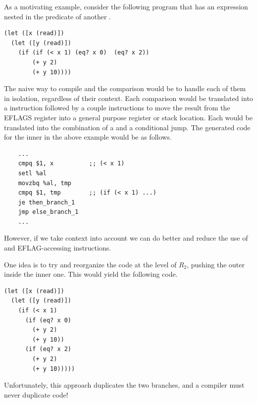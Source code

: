 \documentclass[11pt]{book}
\begin{document}
As a motivating example, consider the following program that has an
 expression nested in the predicate of another .
\begin{center}
\begin{minipage}{0.96\textwidth}
\begin{lstlisting}
(let ([x (read)])
  (let ([y (read)])
    (if (if (< x 1) (eq? x 0)  (eq? x 2))
        (+ y 2)
        (+ y 10))))
\end{lstlisting}
\end{minipage}
\end{center}
%
The naive way to compile  and the comparison would be to
handle each of them in isolation, regardless of their context.  Each
comparison would be translated into a  instruction followed
by a couple instructions to move the result from the EFLAGS register
into a general purpose register or stack location. Each  would
be translated into the combination of a  and a conditional
jump. The generated code for the inner  in the above example
would be as follows.
\begin{center}
\begin{minipage}{0.96\textwidth}
\begin{lstlisting}
    ...
    cmpq $1, x          ;; (< x 1)
    setl %al
    movzbq %al, tmp
    cmpq $1, tmp        ;; (if (< x 1) ...)
    je then_branch_1
    jmp else_branch_1
    ...
\end{lstlisting}
\end{minipage}
\end{center}
However, if we take context into account we can do better and reduce
the use of  and EFLAG-accessing instructions.

One idea is to try and reorganize the code at the level of $R_2$,
pushing the outer  inside the inner one. This would yield the
following code.
\begin{center}
\begin{minipage}{0.96\textwidth}
\begin{lstlisting}
(let ([x (read)])
  (let ([y (read)])
    (if (< x 1) 
      (if (eq? x 0)
        (+ y 2)
        (+ y 10))
      (if (eq? x 2)
        (+ y 2)
        (+ y 10)))))
\end{lstlisting}
\end{minipage}
\end{center}
Unfortunately, this approach duplicates the two branches, and a
compiler must never duplicate code!
\end{document}
